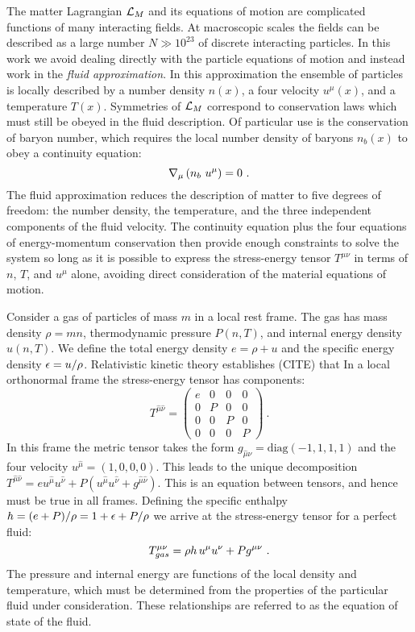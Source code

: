    The matter Lagrangian $\mathcal{L}_M$ and its equations of motion are complicated functions of many interacting fields.  At macroscopic scales the fields can be described as a large number $N \gg 10^{23}$ of discrete interacting particles.  In this work we avoid dealing directly with the particle equations of motion and instead work in the \emph{fluid approximation}.    In this approximation the ensemble of particles is locally described by a number density $n(x)$, a four velocity $u^\mu(x)$, and a temperature $T(x)$.  Symmetries of $\mathcal{L}_M$ correspond to conservation laws which must still be obeyed in the fluid description.  Of particular use is the conservation of baryon number, which requires the local number density of baryons $n_b(x)$ to obey a continuity equation:
   \begin{equation}
   	\nabla_\mu \left(n_b\ u^\mu\right) = 0 \eqlabel{contnb}\ .
   \end{equation}
  The fluid approximation reduces the description of matter to five degrees of freedom: the number density, the temperature, and the three independent components of the fluid velocity.  The continuity equation  plus the four equations of energy-momentum conservation  then provide enough constraints to solve the system so long as it is possible to express the stress-energy tensor $T^{\mu\nu}$ in terms of $n$, $T$, and $u^\mu$ alone, avoiding direct consideration of the material equations of motion.
  
  Consider a gas of particles of mass $m$ in a local rest frame. The gas has mass density $\rho = m n$, thermodynamic pressure $P(n,T)$, and internal energy density $u(n,T)$.  We define the total energy density $e = \rho + u$ and the specific energy density $\epsilon = u / \rho$.  Relativistic kinetic theory establishes (CITE) that In a local orthonormal frame the stress-energy tensor has components:
  \begin{equation}
  	T^{\hat{\mu}\hat{\nu}} = \begin{pmatrix} e & 0 & 0 & 0 \\
									0 & P & 0 & 0 \\
									0 & 0 & P & 0 \\
									0 & 0 & 0 & P \end{pmatrix}\ .
  \end{equation}
In this frame the metric tensor takes the form $g_{\hat{\mu}\hat{\nu}} = \text{diag}(-1,1,1,1)$ and the four velocity $u^{\hat{\mu}}  = (1,0,0,0)$.  This leads to the unique decomposition $T^{\hat{\mu}\hat{\nu}} = e u^{\hat{\mu}}u^{\hat{\nu}} + P ( u^{\hat{\mu}}u^{\hat{\nu}} + g^{\hat{\mu}\hat{\nu}})$.  This is an equation between tensors, and hence must be true in all frames. Defining the specific enthalpy $h = (e+P)/\rho = 1 + \epsilon + P/\rho$ we arrive at the stress-energy tensor for a perfect fluid:
\begin{equation}
	T^{\mu\nu}_{gas} = \rho h \ \! u^\mu u^\nu + P g^{\mu\nu} \eqlabel{defTgas}\ .
\end{equation}
The pressure and internal energy are functions of the local density and temperature, which must be determined from the properties of the particular fluid under consideration.  These relationships are referred to as the equation of state of the fluid.

